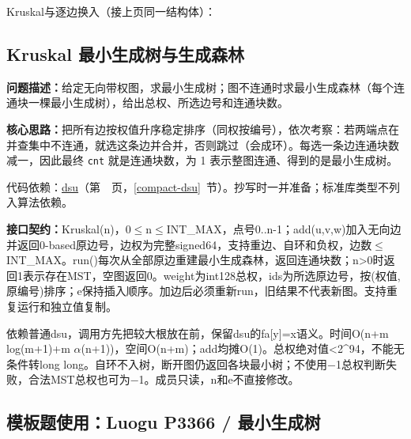 

\newpage

\noindent Kruskal与逐边换入（接上页同一结构体）：



\Needspace{625pt}

\subsection{Kruskal 最小生成树与生成森林}\label{compact-Kruskal}

\noindent\textbf{问题描述：}\allowbreak 给定无向带权图，求最小生成树；图不连通时求最小生成森林（每个连通块一棵最小生成树），给出总权、所选边号和连通块数。

\textbf{核心思路：}\allowbreak 把所有边按权值升序稳定排序（同权按编号），依次考察：若两端点在并查集中不连通，就选这条边并合并，否则跳过（会成环）。每选一条边连通块数减一，因此最终 \texttt{cnt} 就是连通块数，为 1 表示整图连通、得到的是最小生成树。

代码依赖：\hyperref[compact-dsu]{dsu}（第~\pageref{compact-dsu}~页，\ref{compact-dsu}~节）。抄写时一并准备；标准库类型不列入算法依赖。

{\sloppy{}\noindent\textbf{接口契约：}Kruskal(n)，0$\le$n$\le$INT\_MAX，点号0..n-1；add(u,v,w)加入无向边并返回0-based原边号，边权为完整signed64，支持重边、自环和负权，边数$\le$INT\_MAX。run()每次从全部原边重建最小生成森林，返回连通块数；n>0时返回1表示存在MST，空图返回0。weight为int128总权，ids为所选原边号，按(权值,原编号)排序；e保持插入顺序。加边后必须重新run，旧结果不代表新图。支持重复运行和独立值复制。

依赖普通dsu，调用方先把较大根放在前，保留dsu的fa[y]=x语义。时间O(n+m log(m+1)+m $\alpha$(n+1))，空间O(n+m)；add均摊O(1)。总权绝对值<2\textasciicircum{}94，不能无条件转long long。自环不入树，断开图仍返回各块最小树；不使用−1总权判断失败，合法MST总权也可为−1。成员只读，n和e不直接修改。\par}



\newpage

\Needspace{426pt}

\subsection*{模板题使用：Luogu P3366 / 最小生成树}

